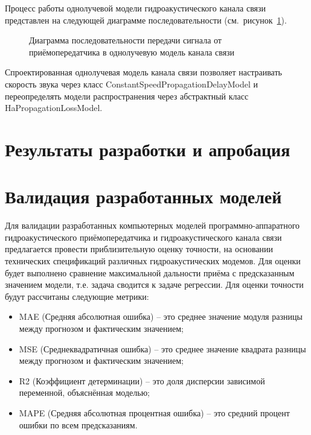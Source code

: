 \documentclass[
    numbers=section,
    document-code={ВКРБ--09.03.04--10.19--XX--26--81}
]{../latex/fqw}
\begin{document}
    Процесс работы однолучевой модели гидроакустического канала связи
    представлен на следующей диаграмме последовательности
    (см.~рисунок~\ref{fig:sequence_diagram_of_signal_transmission_from_the_transceiver_to_single_beam_channel_model}).

    \begin{figure}[H]
        \centering
        \fbox{\rule{0pt}{20mm}\rule{40mm}{0pt}}
        \caption{Диаграмма последовательности передачи сигнала от приёмопередатчика в однолучевую модель канала связи}
        \label{fig:sequence_diagram_of_signal_transmission_from_the_transceiver_to_single_beam_channel_model}
    \end{figure}

    Спроектированная однолучевая модель канала связи позволяет настраивать скорость звука
    через класс ConstantSpeedPropagationDelayModel и
    переопределять модели распространения
    через абстрактный класс HaPropagationLossModel.


    \section{Результаты разработки и апробация}\label{sec:development_results_and_validation}


    \section{Валидация разработанных моделей}\label{sec:development_results_and_validation2}

    Для валидации разработанных компьютерных моделей
    программно-аппаратного гидроакустического приёмопередатчика и
    гидроакустического канала связи
    предлагается провести приблизительную оценку точности,
    на основании технических спецификаций различных гидроакустических модемов.
    Для оценки будет выполнено сравнение максимальной дальности приёма с предсказанным значением модели,
    т.е. задача сводится к задаче регрессии. Для оценки точности будут рассчитаны следующие метрики:

    \begin{itemize}
        \item MAE (Средняя абсолютная ошибка) -- это
        среднее значение модуля разницы между прогнозом и фактическим значением;
        \item MSE (Среднеквадратичная ошибка) -- это
        среднее значение квадрата разницы между прогнозом и фактическим значением;
        \item
        R2 (Коэффициент детерминации) -- это
        доля дисперсии зависимой переменной, объяснённая моделью;
        \item MAPE (Средняя абсолютная процентная ошибка) -- это
        средний процент ошибки по всем предсказаниям.
    \end{itemize}
\end{document}
